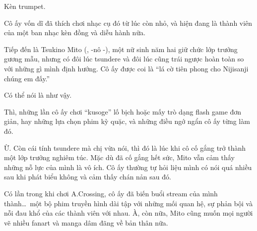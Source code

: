 \documentclass[../main.tex]{subfiles}
\begin{document}
Kèn trumpet.


Cô ấy vốn dĩ đã thích chơi nhạc cụ đó từ lúc còn nhỏ, và hiện đang là thành viên của một ban nhạc kèn đồng và diễu hành nữa.




Tiếp đến là Tsukino Mito (, -nô -), một nữ sinh năm hai giữ chức lớp trưởng gương mẫu, nhưng có đôi lúc tsundere và đôi lúc cũng trái ngược hoàn toàn so với những gì mình định hướng. Cô ấy được coi là ``lá cờ tiên phong cho Nijisanji chúng em đấy.''


Có thể nói là như vậy.


Thì, những lần cô ấy chơi ``kusoge'' lố bịch hoặc mấy trò dạng flash game đơn giản, hay những lựa chọn phim kỳ quặc, và những điều ngớ ngẩn cô ấy từng làm đó.


Ừ. Còn cái tính tsundere mà chị vừa nói, thì đó là lúc khi cô cố gắng trở thành một lớp trưởng nghiêm túc. Mặc dù đã cố gắng hết sức, Mito vẫn cảm thấy những nỗ lực của mình là vô ích. Cô ấy thường tự hỏi liệu mình có nói quá nhiều sau khi phát biểu không và cảm thấy chán nản sau đó.


Có lần trong khi chơi A.Crossing, cô ấy đã biến buổi stream của mình thành\dots\ một bộ phim truyền hình dài tập với những mối quan hệ, sự phản bội và nỗi đau khổ của các thành viên với nhau. À, còn nữa, Mito cũng muốn mọi người vẽ nhiều fanart và manga dâm đãng về bản thân nữa.

\end{document}
